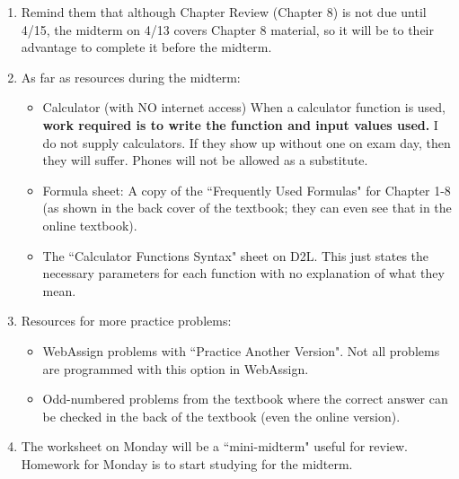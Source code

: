\documentclass{article}
\begin{document}
\begin{enumerate}

    \item Remind them that although Chapter Review (Chapter 8) is not due until 4/15, the midterm on 4/13 covers Chapter 8 material, so it will be to their advantage to complete it before the midterm.

    \item As far as resources during the midterm:
        
        \begin{itemize}
        
            \item Calculator (with NO internet access) When a calculator function is used, \textbf{work required is to write the function and input values used.} I do not supply calculators. If they show up without one on exam day, then they will suffer. Phones will not be allowed as a substitute.
            
            \item Formula sheet: A copy of the ``Frequently Used Formulas" for Chapter 1-8 (as shown in the back cover of the textbook; they can even see that in the online textbook).
            
            \item The ``Calculator Functions Syntax" sheet on D2L. This just states the necessary parameters for each function with no explanation of what they mean.
            
        \end{itemize}
        
    \item Resources for more practice problems:
        
        \begin{itemize}
        
            \item WebAssign problems with ``Practice Another Version".  Not all problems are programmed with this option in WebAssign.
            
            \item Odd-numbered problems from the textbook where the correct answer can be checked in the back of the textbook (even the online version).
            
        \end{itemize}
    
    \item The worksheet on Monday will be a ``mini-midterm" useful for review. Homework for Monday is to start studying for the midterm.
    
\end{enumerate}
\end{document}
